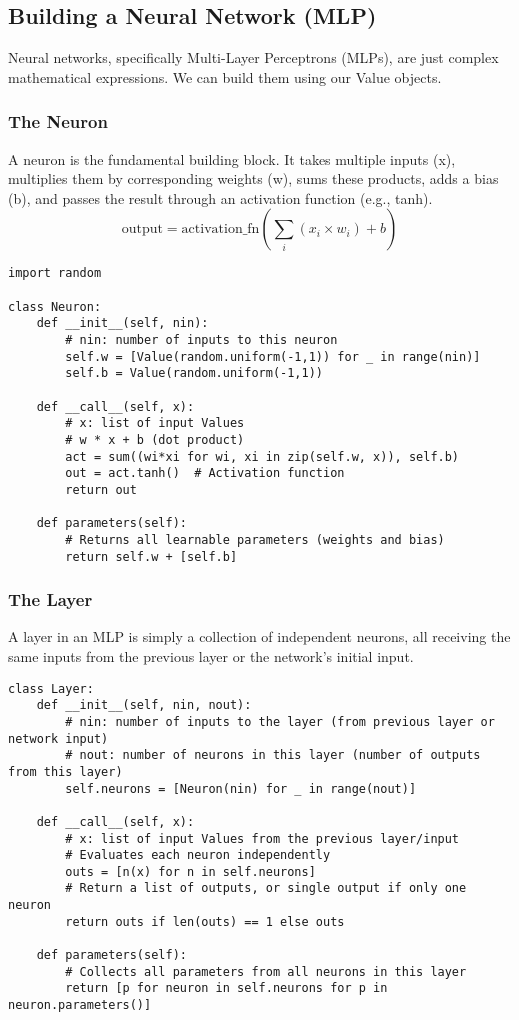 \subsection{Building a Neural Network (MLP)}
Neural networks, specifically Multi-Layer Perceptrons (MLPs), are just complex mathematical expressions. We can build them using our Value objects.

\subsubsection{The Neuron} 
A neuron is the fundamental building block. It takes multiple inputs (x), multiplies them by corresponding weights (w), sums these products, adds a bias (b), and passes the result through an activation function (e.g., tanh).
$$ \text{output} = \text{activation\_fn}\left(\sum_i (x_i \times w_i) + b\right) $$

\begin{lstlisting}[caption={Neuron Class Implementation}] 
import random

class Neuron: 
    def __init__(self, nin): 
        # nin: number of inputs to this neuron 
        self.w = [Value(random.uniform(-1,1)) for _ in range(nin)] 
        self.b = Value(random.uniform(-1,1))

    def __call__(self, x):
        # x: list of input Values
        # w * x + b (dot product)
        act = sum((wi*xi for wi, xi in zip(self.w, x)), self.b)
        out = act.tanh()  # Activation function
        return out

    def parameters(self):
        # Returns all learnable parameters (weights and bias)
        return self.w + [self.b]
\end{lstlisting}

\subsubsection{The Layer} 
A layer in an MLP is simply a collection of independent neurons, all receiving the same inputs from the previous layer or the network's initial input.

\begin{lstlisting}[caption={Layer Class Implementation}] 
class Layer: 
    def __init__(self, nin, nout): 
        # nin: number of inputs to the layer (from previous layer or network input) 
        # nout: number of neurons in this layer (number of outputs from this layer) 
        self.neurons = [Neuron(nin) for _ in range(nout)]

    def __call__(self, x):
        # x: list of input Values from the previous layer/input
        # Evaluates each neuron independently
        outs = [n(x) for n in self.neurons]
        # Return a list of outputs, or single output if only one neuron
        return outs if len(outs) == 1 else outs

    def parameters(self):
        # Collects all parameters from all neurons in this layer
        return [p for neuron in self.neurons for p in neuron.parameters()]
\end{lstlisting}

